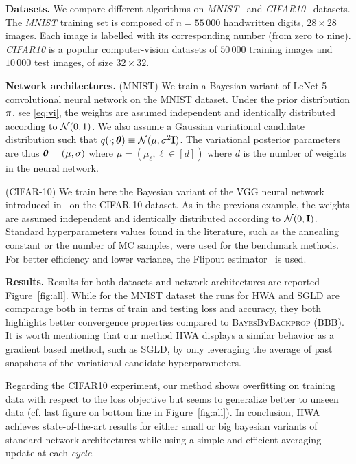 \documentclass{article} %
\begin{document}
\textbf{Datasets.}\hspace{0.1in}
We compare different algorithms on \textit{MNIST}~\citep{lecun-mnisthandwrittendigit-2010} and \textit{CIFAR10}~\citep{krizhevsky2009learning} datasets.
The \textit{MNIST} training set is composed of $n=55\,000$ handwritten digits, $28 \times 28$ images. Each image is labelled with its corresponding number (from zero to nine).
\textit{CIFAR10} is a popular computer-vision datasets of $50\,000$ training images and $10\,000$ test images, of size $32\times 32$. 

\textbf{Network architectures.} \hspace{0.1in}
(MNIST) We train a Bayesian variant of LeNet-5 convolutional neural network on the MNIST dataset. 
Under the prior distribution $\prior$, see \eqref{eq:vi}, the weights are assumed  independent and identically distributed according to ${\cal N}(0,1)$.
We also assume a Gaussian variational candidate distribution such that $q(\cdot; \param) \equiv  \mathcal{N}(\mu,\sigma^2 \Id )$.
The variational posterior parameters are thus $\param = (\mu, \sigma) $ where $\mu = (\mu_\ell, \ell \in [d])$ where $d$ is the number of weights in the neural network. 


(CIFAR-10) We train here the Bayesian variant of the VGG neural network introduced in~\citep{simonyan2014very} on the CIFAR-10 dataset.
As in the previous example, the weights are assumed  independent and identically distributed according to ${\cal N}(0,\Id)$.
Standard hyperparameters values found in the literature, such as the annealing constant or the number of MC samples, were used for the benchmark methods. 
For better efficiency and lower variance, the Flipout estimator~\citep{wen2018flipout} is used.

\textbf{Results.} \hspace{0.1in} 
Results for both datasets and network architectures are reported Figure~\ref{fig:all}.
While for the MNIST dataset the runs for \textsc{HWA} and \textsc{SGLD} are com:parage both in terms of train and testing loss and accuracy, they both highlights better convergence properties compared to \textsc{BayesByBackprop} (BBB).
It is worth mentioning that our method \textsc{HWA} displays a similar behavior as a gradient based method, such as \textsc{SGLD}, by only leveraging the average of past snapshots of the variational candidate hyperparameters. 

Regarding the CIFAR10 experiment, our method shows overfitting on training data with respect to the loss objective but seems to generalize better to unseen data (cf. last figure on bottom line in Figure~\ref{fig:all}).
In conclusion, \textsc{HWA} achieves state-of-the-art results for either small or big bayesian variants of standard network architectures while using a simple and efficient averaging update at each \textit{cycle}.
\end{document}
